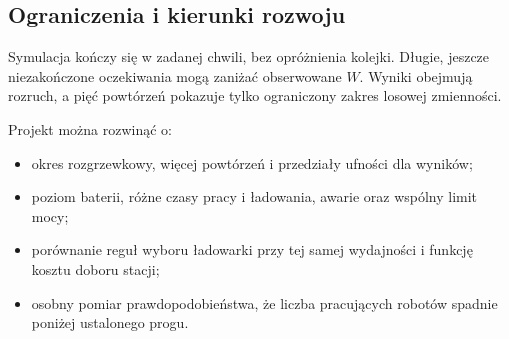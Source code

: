 \documentclass[11pt,a4paper]{article}
\begin{document}
\subsection{Ograniczenia i kierunki rozwoju}
Symulacja kończy się w zadanej chwili, bez opróżnienia kolejki. Długie, jeszcze niezakończone oczekiwania mogą zaniżać obserwowane $W$. Wyniki obejmują rozruch, a pięć powtórzeń pokazuje tylko ograniczony zakres losowej zmienności.

Projekt można rozwinąć o:
\begin{itemize}
\item okres rozgrzewkowy, więcej powtórzeń i przedziały ufności dla wyników;
\item poziom baterii, różne czasy pracy i ładowania, awarie oraz wspólny limit mocy;
\item porównanie reguł wyboru ładowarki przy tej samej wydajności i funkcję kosztu doboru stacji;
\item osobny pomiar prawdopodobieństwa, że liczba pracujących robotów spadnie poniżej ustalonego progu.
\end{itemize}
\end{document}
